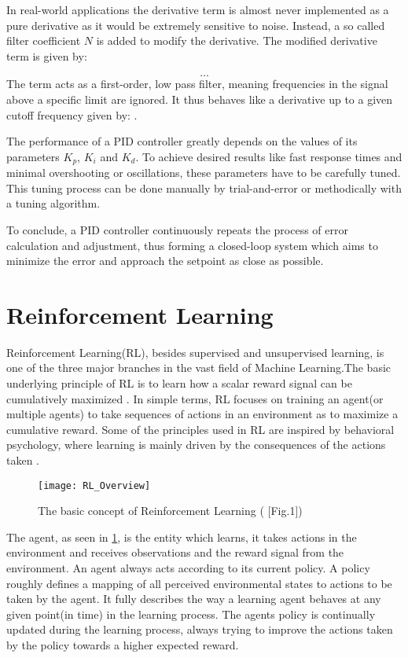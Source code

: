 In real-world applications the derivative term is almost never implemented as a pure derivative as it would be extremely sensitive to noise.
Instead, a so called filter coefficient $N$ is added to modify the derivative.
The modified derivative term is given by:

\[
...
\]
The term acts as a first-order, low pass filter, meaning frequencies in the signal above a specific limit are ignored.
It thus behaves like a derivative up to a given cutoff frequency given by: .

The performance of a PID controller greatly depends on the values of its parameters $K_p$, $K_i$ and $K_d$.
To achieve desired results like fast response times and minimal overshooting or oscillations, these parameters have to be carefully tuned. 
This tuning process can be done manually by trial-and-error or methodically with a tuning algorithm.

To conclude, a PID controller continuously repeats the process of error calculation and adjustment, thus forming a closed-loop system which aims to minimize the error and approach the setpoint as close as possible.





\section{Reinforcement Learning}

Reinforcement Learning(RL), besides supervised and unsupervised learning, is one of the three major branches in the vast field of Machine Learning.The basic underlying principle of RL is to learn how a scalar reward signal can be cumulatively maximized \parencite{sutton2018reinforcement}.
In simple terms, RL focuses on training an agent(or multiple agents) to take sequences of actions in an environment as to maximize a cumulative reward.
Some of the principles used in RL are inspired by behavioral psychology, where learning is mainly driven by the consequences of the actions taken \parencite{sutton2018reinforcement, FINDAUTOR}.

\begin{figure}[h]
	\centerline{\texttt{[image: RL\_Overview]}}
	\caption{The basic concept of Reinforcement Learning (\cite{weng2018bandit} [Fig.1])}
	\label{figure: RL Illustration}
\end{figure}

The agent, as seen in \ref{figure: RL Illustration}, is the entity which learns, it takes actions in the environment and receives observations and the reward signal from the environment.
An agent always acts according to its current policy.
A policy roughly defines a mapping of all perceived environmental states to actions to be taken by the agent.
It fully  describes the way a learning agent behaves at any given point(in time) in the learning process.\parencite{sutton2018reinforcement} \parencite{D. Silver Lec. 2}
The agents policy is continually updated during the learning process, always trying to improve the actions taken by the policy towards a higher expected reward.

